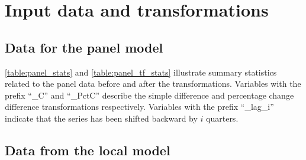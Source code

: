 \section{Input data and transformations}
\label{appx:data}
\subsection{Data for the panel model}
\autoref{table:panel_stats} and \autoref{table:panel_tf_stats} illustrate summary statistics related to the panel data before and after the transformations. Variables with the prefix “\_C” and “\_PctC” describe the simple difference and percentage change difference transformations respectively. Variables with the prefix “\_lag\_i” indicate that the series has been shifted backward by $i$ quarters.



\subsection{Data from the local model}
